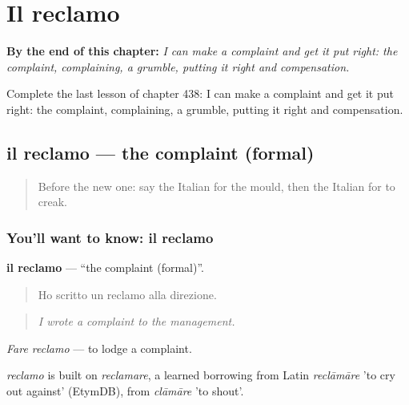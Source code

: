 
\chapter{Il reclamo}
\label{ch:it-il-reclamo}

\begin{chapteropening}
\textbf{By the end of this chapter:} \emph{I can make a complaint and get it put right: the complaint, complaining, a grumble, putting it right and compensation.}

Complete the last lesson of chapter 438: I can make a complaint and get it put right: the complaint, complaining, a grumble, putting it right and compensation.
\end{chapteropening}

\section[il reclamo]{il reclamo — the complaint (formal)}

\label{lesson:IT-C438-reclamo}



\begin{quote}
Before the new one: say the Italian for the mould, then the Italian for to creak.
\end{quote}

\subsection*{You'll want to know: il reclamo}
\textbf{il reclamo} — \textquotedblleft{}the complaint (formal)\textquotedblright{}.

\begin{quote}
Ho scritto un reclamo alla direzione.
\end{quote}

\begin{quote}
\emph{I wrote a complaint to the management.}
\end{quote}

\emph{Fare reclamo} — to lodge a complaint.

\begin{cousinweb}
\emph{reclamo} is built on \emph{reclamare}, a learned borrowing from Latin \emph{reclāmāre} 'to cry out against' (EtymDB), from \emph{clāmāre} 'to shout'.
\end{cousinweb}

